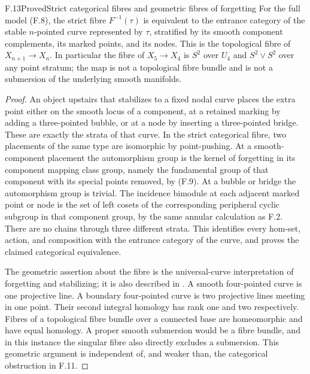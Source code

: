\begin{statement}{F.13}{Proved}{Strict categorical fibres and geometric
fibres of forgetting}
For the full model (F.8), the strict fibre $F^{-1}(\tau)$ is equivalent
to the entrance category of the stable $n$-pointed curve represented by
$\tau$, stratified by its smooth component complements, its marked
points, and its nodes.  This is the topological fibre of
$X_{n+1}\to X_n$.  In particular the fibre of $X_5\to X_4$ is $S^2$
over $U_4$ and $S^2\vee S^2$ over any point stratum; the map is not a
topological fibre bundle and is not a submersion of the underlying
smooth manifolds.
\end{statement}
\begin{proof}
An object upstairs that stabilizes to a fixed nodal curve places the
extra point either on the smooth locus of a component, at a retained
marking by adding a three-pointed bubble, or at a node by inserting a
three-pointed bridge.  These are exactly the strata of that curve.
In the strict categorical fibre, two placements of the same type
are isomorphic by point-pushing.  At a smooth-component placement the
automorphism group is the kernel of forgetting in its component
mapping class group, namely the fundamental group of that component
with its special points removed, by (F.9).  At a bubble or bridge the
automorphism group is trivial.  The incidence bimodule at each adjacent
marked point or node is the set of left cosets of the corresponding
peripheral cyclic subgroup in that component group, by the same
annular calculation as F.2.  There are no chains through three
different strata.  This identifies every hom-set, action, and
composition with the entrance category of the curve, and proves the
claimed categorical equivalence.

The geometric assertion about the fibre is the universal-curve
interpretation of forgetting and stabilizing; it is also described in
\citet[Introduction, pp.~546--548]{FKeel1992}.  A smooth four-pointed
curve is one projective line.  A boundary four-pointed curve is two
projective lines meeting in one point.  Their second integral homology
has rank one and two respectively.  Fibres of a topological fibre
bundle over a connected base are homeomorphic and have equal
homology.  A proper smooth submersion would be a fibre bundle, and
in this instance the singular fibre also directly excludes a
submersion.  This geometric argument is independent of, and weaker
than, the categorical obstruction in F.11.
\end{proof}

